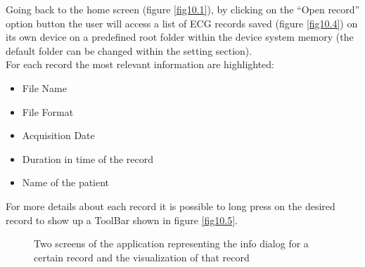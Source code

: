 Going back to the home screen (figure \ref{fig10.1}), by clicking on the “Open record” option button the user will access a list of ECG records saved (figure \ref{fig10.4}) on its own device on a predefined root folder within the device system memory (the default folder can be changed within the setting section).\\
For each record the most relevant information are highlighted:
\begin{itemize}
	\item File Name
	\item File Format
	\item Acquisition Date
	\item Duration in time of the record
	\item Name of the patient
\end{itemize}	
For more details about each record it is possible to long press on the desired record to show up a ToolBar shown in figure \ref{fig10.5}.\\
\begin{figure}[!htb]
	\centering
	\qquad 
	\caption{Two screens of the application representing the info dialog for a certain record and the visualization of that record}  
	\label{fig10.5ab}
\end{figure}

